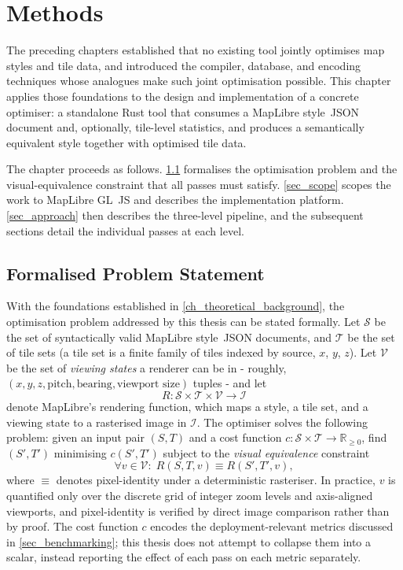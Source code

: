 \chapter{Methods}\label{ch_methods}

The preceding chapters established that no existing tool jointly optimises map styles and tile data, and introduced the compiler, database, and encoding techniques whose analogues make such joint optimisation possible.
This chapter applies those foundations to the design and implementation of a concrete optimiser: a standalone Rust tool that consumes a MapLibre style~JSON document and, optionally, tile-level statistics, and produces a semantically equivalent style together with optimised tile data.

The chapter proceeds as follows.
\cref{sec_problem_statement} formalises the optimisation problem and the visual-equivalence constraint that all passes must satisfy.
\cref{sec_scope} scopes the work to MapLibre GL~JS and describes the implementation platform.
\cref{sec_approach} then describes the three-level pipeline, and the subsequent sections detail the individual passes at each level.

\section{Formalised Problem Statement}\label{sec_problem_statement}

With the foundations established in \cref{ch_theoretical_background}, the optimisation problem addressed by this thesis can be stated formally.
Let $\mathcal{S}$ be the set of syntactically valid MapLibre style~JSON documents, and $\mathcal{T}$ be the set of tile sets (a tile set is a finite family of tiles indexed by source, $x$, $y$, $z$).
Let $\mathcal{V}$ be the set of \emph{viewing states} a renderer can be in - roughly, $(x, y, z, \text{pitch}, \text{bearing}, \text{viewport size})$ tuples - and let
\begin{equation}\label{eq:render_function}
    R : \mathcal{S} \times \mathcal{T} \times \mathcal{V} \to \mathcal{I}
\end{equation}
denote MapLibre's rendering function, which maps a style, a tile set, and a viewing state to a rasterised image in $\mathcal{I}$.
The optimiser solves the following problem: given an input pair $(S, T)$ and a cost function $c : \mathcal{S} \times \mathcal{T} \to \mathbb{R}_{\geq 0}$, find $(S', T')$ minimising $c(S', T')$ subject to the \emph{visual equivalence} constraint
\begin{equation}\label{eq:visual_equivalence}
    \forall v \in \mathcal{V}:\; R(S, T, v) \equiv R(S', T', v),
\end{equation}
where $\equiv$ denotes pixel-identity under a deterministic rasteriser.
In practice, $v$ is quantified only over the discrete grid of integer zoom levels and axis-aligned viewports, and pixel-identity is verified by direct image comparison rather than by proof.
The cost function $c$ encodes the deployment-relevant metrics discussed in \cref{sec_benchmarking}; this thesis does not attempt to collapse them into a scalar, instead reporting the effect of each pass on each metric separately.

